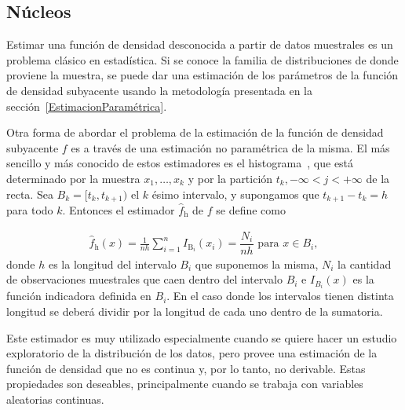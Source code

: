 \subsection{Núcleos}
Estimar una función de densidad desconocida a partir de datos muestrales es un problema clásico en estadística. Si se conoce la familia de distribuciones de donde proviene la muestra, se puede dar una estimación de los parámetros de la función de densidad subyacente usando la metodología presentada en la sección~\ref{EstimacionParamétrica}. 

Otra forma de abordar el problema de la estimación de la función de densidad subyacente $f$ es a través de una estimación no paramétrica de la misma. El más sencillo y más conocido de estos estimadores es el histograma~\cite{Scott1992}, que   está determinado por la muestra ${x_1, \ldots, x_k}$ y por la partición ${t_k, -\infty<j<+\infty}$ de la recta. Sea $B_k=[t_k,t_{k+1})$  el $k$ ésimo intervalo, y supongamos que $t_{k+1}-t_k=h$ para todo $k$. Entonces el estimador $\widehat{f}_\text{h}$ de $f$ se define como 

\begin{align}
\widehat{f}_{\text{h}}(x)=\frac{1}{n h} \sum_{i=1}^n I_{\text{B}_i} (x_i)=\dfrac{N_i}{n h} \text{ para } x \in B_i,
\end{align}
donde $h$ es la longitud del intervalo $B_i$ que suponemos la misma, $N_i$ la cantidad de observaciones muestrales que caen dentro del intervalo $B_i$ e $I_{B_i}(x)$ es la función indicadora definida en $B_i$. En el caso donde los intervalos tienen distinta longitud se deberá dividir por la longitud de cada uno dentro de la sumatoria.

Este estimador es muy utilizado especialmente cuando se quiere hacer un estudio exploratorio de la distribución de los datos, pero provee una estimación de la función de densidad que no es continua y, por lo tanto, no derivable. Estas propiedades son deseables, principalmente cuando se trabaja con variables aleatorias continuas.

